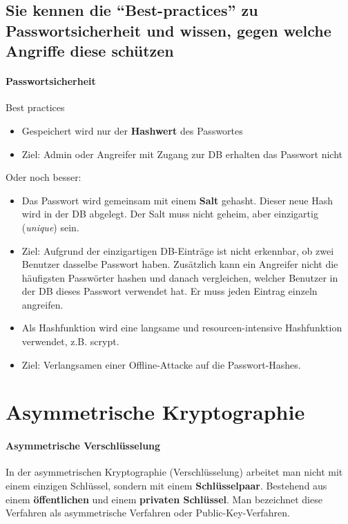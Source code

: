 \documentclass[10pt,a4paper]{article}
\begin{document}
\subsection*{Sie kennen die "`Best-practices"' zu Passwortsicherheit und wissen, gegen welche Angriffe diese schützen}
\paragraph*{Passwortsicherheit}Best practices
\begin{itemize}[noitemsep,topsep=0pt,leftmargin=*]
    \item Gespeichert wird nur der \textbf{Hashwert} des Passwortes
    \item Ziel: Admin oder Angreifer mit Zugang zur DB erhalten das Passwort nicht
\end{itemize}
Oder noch besser:
\begin{itemize}[noitemsep,topsep=0pt,leftmargin=*]
     \item Das Passwort wird gemeinsam mit einem \textbf{Salt} gehasht. Dieser neue Hash wird in der DB abgelegt. Der Salt muss nicht geheim, aber einzigartig (\textsl{unique}) sein.
    \item Ziel: Aufgrund der einzigartigen DB-Einträge ist nicht erkennbar, ob zwei Benutzer dasselbe Passwort haben. Zusätzlich kann ein Angreifer nicht die häufigsten Passwörter hashen und danach vergleichen, welcher Benutzer in der DB dieses Passwort verwendet hat. Er muss jeden Eintrag einzeln angreifen.
    \item Als Hashfunktion wird eine langsame und resourcen-intensive Hashfunktion verwendet, z.B. scrypt.
    \item Ziel: Verlangsamen einer Offline-Attacke auf die Passwort-Hashes.
\end{itemize}

\pagebreak
\section{Asymmetrische Kryptographie}
\paragraph*{Asymmetrische Verschlüsselung}In der asymmetrischen Kryptographie (Verschlüsselung) arbeitet man nicht mit einem einzigen Schlüssel, sondern mit einem \textbf{Schlüsselpaar}. Bestehend aus einem \textbf{öffentlichen} und einem \textbf{privaten Schlüssel}. Man bezeichnet diese Verfahren als asymmetrische Verfahren oder \mbox{Public-Key-Verfahren}.
\end{document}
